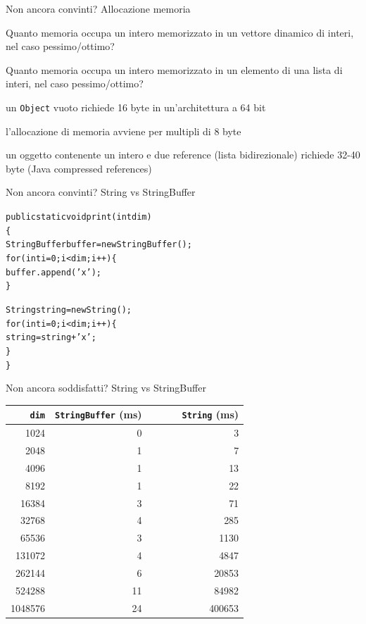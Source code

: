 \begin{frame}{Non ancora convinti? Allocazione memoria}

\begin{myboxtitle}[Domande]
\BI
\item Quanto memoria occupa un intero memorizzato in un vettore dinamico di interi, nel caso pessimo/ottimo?
\item Quanto memoria occupa un intero memorizzato in un elemento di una lista di interi, nel caso pessimo/ottimo? 
\EI
\end{myboxtitle}

\pause
{}
\BI
\item un \texttt{Object} vuoto richiede 16 byte in un'architettura a 64 bit
\item l'allocazione di memoria avviene per multipli di 8 byte
\item un oggetto contenente un intero e due reference (lista bidirezionale) richiede 32-40 byte
(Java compressed references)
\EI

\end{frame}

\begin{frame}{Non ancora convinti? String vs StringBuffer}

\begin{alltt}
public static void print(int dim)
\{
  StringBuffer buffer = new \alert{StringBuffer}();
  for (int i=0; i < dim; i++) \{
    \alert{buffer.append('x')};	
  \}

  String string = new \alert{String}();
  for (int i=0; i < dim; i++) \{
    \alert{string = string + 'x'};	
  \} 
\}
\end{alltt}

\end{frame}

\begin{frame}{Non ancora soddisfatti? String vs StringBuffer}

\begin{center}
\begin{tabular}{|r|r|r|}
\hline
\texttt{dim} & \texttt{StringBuffer} (ms) & \texttt{\ \ \ \ \ \ String} (ms)\\
\hline
1024 & 0 & 3 \\
2048 & 1 & 7 \\  
4096 & 1 & 13 \\
8192 & 1 & 22 \\
16384 & 3 & 71 \\
32768 & 4 & 285 \\
65536 & 3 & 1130 \\
131072 & 4 & 4847 \\
262144 & 6 & 20853 \\
524288 & 11 & 84982 \\
1048576 & 24 & 400653 \\
\hline
\end{tabular}
\end{center}

\end{frame}

